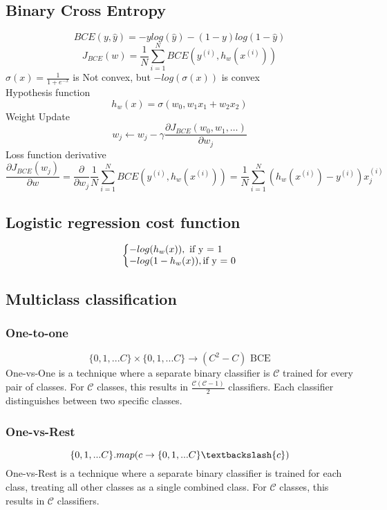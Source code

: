 \documentclass{article}
\makeatletter
\newenvironment{system}%
{\left\lbrace\begin{array}{@{}l@{}}}%
{\end{array}\right.}
\makeatother
\begin{document}
\subsection*{Binary Cross Entropy}
\[BCE(y, \hat{y}) = -ylog(\hat{y}) - (1 - y)log(1 - \hat{y})\]
\[J_{BCE}(w) = \frac{1}{N} \sum_{i=1}^{N} BCE(y^{(i)}, h_w(x^{(i)}))\]
$\sigma(x) = \frac{1}{1 + e^{-x}}$ is Not convex, but
$-log(\sigma(x))$ is convex\\
Hypothesis function
\[h_w(x) = \sigma(w_0, w_1 x_1 + w_2 x_2) \]
Weight Update
\[w_j \leftarrow w_j - \gamma \frac{\partial J_{BCE}(w_0, w_1, \dots)}{\partial w_j}\]
Loss function derivative
\[\frac{\partial J_{BCE}(w_j)}{\partial w} = \frac{\partial}{\partial w_j} \frac{1}{N} \sum_{i=1}^{N} BCE(y^{(i)}, h_w(x^{(i)})) = \frac{1}{N} \sum_{i=1}^{N} (h_w(x^{(i)}) - y^{(i)})x_j^{(i)}\]
\subsection{Logistic regression cost function}
\begin{equation}
    \begin{system}
    -log(h_w(x)), \text{ if y = 1}\\
    -log(1 - h_w(x)), \text{if y = 0}
    \end{system}
\end{equation}


\subsection*{Multiclass classification}
\subsubsection*{One-to-one}
\[\{0, 1, ... C\} \times \{0, 1, ... C\} \rightarrow (C^2 - C) \text{ BCE}\]
One-vs-One is a technique where a separate binary classifier is $\mathcal{C}$ trained for every pair of classes. For $\mathcal{C}$ classes, this results in $\frac{\mathcal{C}(\mathcal{C} - 1)}{2}$ classifiers. Each classifier distinguishes between two specific classes.
\subsubsection*{One-vs-Rest}
\[\{0, 1, ... C\}.map(c \rightarrow \{0, 1, ... C\} \textbackslash \{c\})\]
One-vs-Rest is a technique where a separate binary classifier is trained for each class, treating all other classes as a single combined class. For $\mathcal{C}$ classes, this results in $\mathcal{C}$ classifiers.
\end{document}
